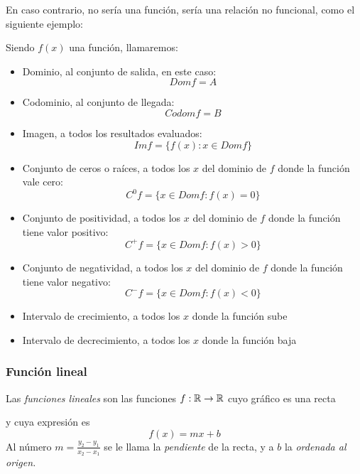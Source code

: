 \documentclass[../Teoría.root.tex]{subfiles}
\begin{document}
En caso contrario, no sería una función, sería una relación no funcional, como el siguiente ejemplo:
\begin{center}
\end{center}
Siendo \(f(x)\) una función, llamaremos:
\begin{itemize}
    \item Dominio, al conjunto de salida, en este caso:
          \[Dom f=A\]
    \item Codominio, al conjunto de llegada:
          \[Codom f=B\]
    \item Imagen, a todos los resultados evaluados:
          \[Im f=\{f(x):x \in Dom f\}\]
    \item Conjunto de ceros o raíces, a todos los \(x\) del dominio de \(f\) donde la función vale cero:
          \[C^0 f=\{x\in Dom f:f(x)=0\}\]
    \item Conjunto de positividad, a todos los \(x\) del dominio de \(f\) donde la función tiene valor positivo:
          \[C^+ f=\{x\in Dom f:f(x) > 0\}\]
    \item Conjunto de negatividad, a todos los \(x\) del dominio de \(f\) donde la función tiene valor negativo:
          \[C^- f=\{x\in Dom f:f(x) < 0\}\]
    \item Intervalo de crecimiento, a todos los \(x\) donde la función sube
    \item Intervalo de decrecimiento, a todos los \(x\) donde la función baja
\end{itemize}
\subsubsection{Función lineal}
Las \textit{funciones lineales} son las funciones \(f: \mathbb{R} \rightarrow \mathbb{R}\) cuyo gráfico es una recta
\begin{center}
\end{center}
y cuya expresión es \[f(x)=mx+b\] Al número \(m = \frac{y_2-y_1}{x_2-x_1}\) se le llama la \textit{pendiente} de la recta, y a \(b\) la \textit{ordenada al origen.}
\end{document}
